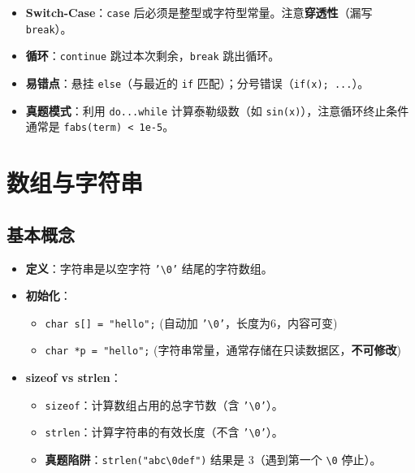 \documentclass[a4paper,12pt]{article}
\begin{document}
\begin{itemize}
    \item \textbf{Switch-Case}：\texttt{case} 后必须是整型或字符型常量。注意\textbf{穿透性}（漏写 \texttt{break}）。
    \item \textbf{循环}：\texttt{continue} 跳过本次剩余，\texttt{break} 跳出循环。
    \item \textbf{易错点}：悬挂 \texttt{else}（与最近的 \texttt{if} 匹配）；分号错误（\texttt{if(x); ...}）。
    \item \textbf{真题模式}：利用 \texttt{do...while} 计算泰勒级数（如 \texttt{sin(x)}），注意循环终止条件通常是 \texttt{fabs(term) < 1e-5}。
\end{itemize}

\section{数组与字符串}

\subsection{基本概念}
\begin{itemize}
    \item \textbf{定义}：字符串是以空字符 \texttt{'\textbackslash 0'} 结尾的字符数组。
    \item \textbf{初始化}：
    \begin{itemize}
        \item \texttt{char s[] = "hello";} (自动加 \texttt{'\textbackslash 0'}，长度为6，内容可变)
        \item \texttt{char *p = "hello";} (字符串常量，通常存储在只读数据区，\textbf{不可修改})
    \end{itemize}
    \item \textbf{sizeof vs strlen}：
    \begin{itemize}
        \item \texttt{sizeof}：计算数组占用的总字节数（含 \texttt{'\textbackslash 0'}）。
        \item \texttt{strlen}：计算字符串的有效长度（不含 \texttt{'\textbackslash 0'}）。
        \item \textbf{真题陷阱}：\texttt{strlen("abc\textbackslash 0def")} 结果是 3（遇到第一个 \texttt{\textbackslash 0} 停止）。
    \end{itemize}
\end{itemize}
\end{document}
